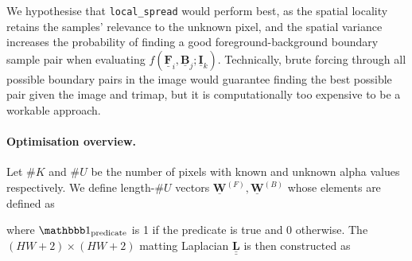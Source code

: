 \documentclass{article}
\theoremstyle{definition}
\def\vt#1{\underline{\mathbf{#1}}}
\def\mt#1{\underline{\underline{\mathbf{#1}}}}
\begin{document}
\begin{multicols}{2}[]
We hypothesise that \verb|local_spread| would perform best, as the spatial locality retains the samples' relevance to the unknown pixel, and  the spatial variance increases the probability of finding a good foreground-background boundary sample pair when evaluating $f(\vt F_i, \vt B_j; \vt I_k)$. Technically, brute forcing through all possible boundary pairs in the image would guarantee finding the best possible pair given the image and trimap, but it is computationally too expensive to be a workable approach.


\paragraph{Optimisation overview.} Let $\#K$ and $\#U$ be the number of pixels with known and unknown alpha values respectively. We define length-$\#U$ vectors $\vt W^{(F)}, \vt W^{(B)}$ whose elements are defined as

\begin{center}
\end{center}

where $\mathbbb1_\text{predicate}$ is 1 if the predicate is true and 0 otherwise. The $(HW+2)\times(HW+2)$ matting Laplacian $\mt L$ is then constructed as


\end{multicols}
\end{document}
